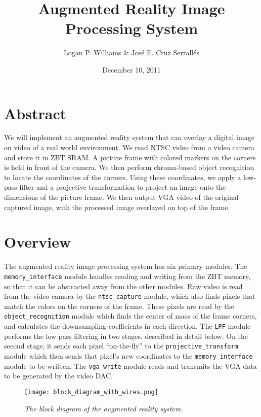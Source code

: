 \documentclass[10pt]{article}
\begin{document}
\title{Augmented Reality Image Processing System}
\author{Logan P. Williams \& Jos\'{e} E. Cruz Serrall\'{e}s}
\date{December 10, 2011}
\maketitle

\section*{Abstract}
We will implement an augmented reality system that can overlay a digital image on video of a real world environment. We read NTSC video from a video camera and store it in ZBT SRAM. A picture frame with colored markers on the corners is held in front of the camera. We then perform chroma-based object recognition to locate the coordinates of the corners. Using these coordinates, we apply a low-pass filter and a projective transformation to project an image onto the dimensions of the picture frame. We then output VGA video of the original captured image, with the processed image overlayed on top of the frame.

\newpage

\tableofcontents
\listoffigures

\newpage

\section{Overview}
The augmented reality image processing system has six primary modules. The {\tt memory\_interface} module handles reading and writing from the ZBT memory, so that it can be abstracted away from the other modules. Raw video is read from the video camera by the {\tt ntsc\_capture} module, which also finds pixels that match the colors on the corners of the frame. These pixels are read by the {\tt object\_recognition} module which finds the center of mass of the frame corners, and calculates the downsampling coefficients in each direction. The {\tt LPF} module performs the low pass filtering in two stages, described in detail below. On the second stage, it sends each pixel ``on-the-fly'' to the {\tt projective\_transform} module which then sends that pixel's new coordinates to the {\tt memory\_interface} module to be written. The {\tt vga\_write} module reads and transmits the VGA data to be generated by the video DAC.


\begin{figure}[h!]
\centering
\texttt{[image: block\_diagram\_with\_wires.png]}
\caption{\emph{The block diagram of the augmented reality system.}}
\end{figure}
\end{document}

